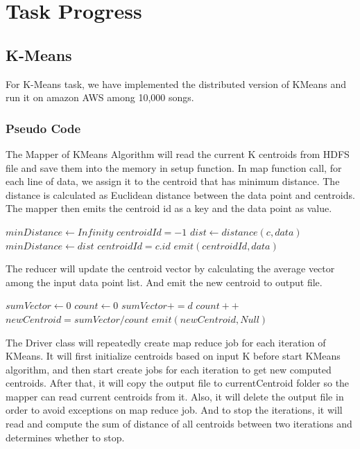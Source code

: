\documentclass[11pt]{article} %
\begin{document}
\section{Task Progress}
\subsection{K-Means}
For K-Means task, we have implemented the distributed version of KMeans and run it on amazon AWS among 10,000 songs.
\subsubsection{Pseudo Code}
The Mapper of KMeans Algorithm will read the current K centroids from HDFS file and save them into the memory in setup function. In map function call, for each line of data, we assign it to the centroid that has minimum distance. The distance is calculated as Euclidean distance between the data point and centroids. The mapper then emits the centroid id as a key and the data point as value.

\begin{algorithmic}[1]
\State $minDistance \gets Infinity$
\State $centroidId = -1$
	\State $dist \gets distance(c, data)$
		\State $minDistance \gets dist$
		\State $centroidId = c.id$
	\EndIf
\EndFor
\State $emit(centroidId, data)$
\EndFunction
\end{algorithmic}

The reducer will update the centroid vector by calculating the average vector among the input data point list. And emit the new centroid to output file.
\begin{algorithmic}[1]
\State $sumVector \gets 0$
\State $count \gets 0$
	\State $sumVector +=  d$
	\State $count ++$
\EndFor
\State $newCentroid = sumVector / count$
\State $emit(newCentroid, Null)$
\EndFunction
\end{algorithmic}

The Driver class will repeatedly create map reduce job for each iteration of KMeans. It will first initialize centroids based on input K before start KMeans algorithm, and then start create jobs for each iteration to get new computed centroids. After that, it will copy the output file to currentCentroid folder so the mapper can read current centroids from it. Also, it will delete the output file in order to avoid exceptions on map reduce job. And to stop the iterations, it will read and compute the sum of distance of all centroids between two iterations and determines whether to stop.
\end{document}

